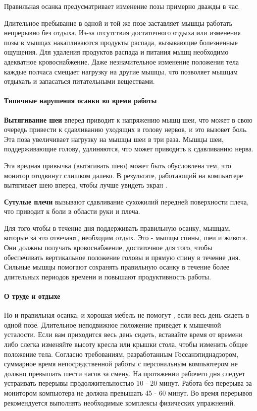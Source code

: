 \documentclass[russian,utf8,emptystyle]{eskdtext}
\begin{document}
\begin{spacing}{1.5}
Правильная осанка предусматривает изменение позы примерно дважды в час. 

Длительное пребывание в одной и той же позе заставляет мышцы работать непрерывно без отдыха. Из-за отсутствия достаточного отдыха или изменения позы в мышцах накапливаются продукты распада, вызывающие болезненные ощущения. Для удаления продуктов распада и питания мышц необходимо адекватное кровоснабжение. Даже незначительное изменение положения тела каждые полчаса смещает нагрузку на другие мышцы, что позволяет мышцам отдыхать и запасаться питательными веществами. 

\paragraph{Типичные нарушения осанки во время работы}
\textbf{Вытягивание шеи} вперед приводит к напряжению мышц шеи, что может в свою очередь привести к сдавливанию уходящих в голову нервов, и это вызовет боль. Эта поза увеличивает нагрузку на мышцы шеи в три раза. Мышцы шеи, поддерживающие голову, удлиняются, что может приводить к сдавливанию нерва.

Эта вредная привычка (вытягивать шею) может быть обусловлена тем, что монитор отодвинут слишком далеко. В результате, работающий на компьютере вытягивает шею вперед, чтобы лучше увидеть экран \cite{Shilova}.

\textbf{Сутулые плечи} вызывают сдавливание сухожилий передней поверхности плеча, что приводит к боли в области руки и плеча.

Для того чтобы в течение дня поддерживать правильную осанку, мышцам, которые за это отвечают, необходим отдых. Это - мышцы спины, шеи и живота. Они должны получать кровоснабжение, достаточное для того, чтобы обеспечивать вертикальное положение головы и прямую спину в течение дня. Сильные мышцы помогают сохранять правильную осанку в течение более длительных периодов времени и повышают продуктивность работы. 

\paragraph{О труде и отдыхе}
Но и правильная осанка, и хорошая мебель не помогут \cite{Shilova}, если весь день сидеть в одной позе. Длительное неподвижное положение приведет к мышечной усталости. Если вам приходится весь день сидеть, вставайте время от времени либо слегка изменяйте высоту кресла или крышки стола, чтобы изменить общее положение тела.
Согласно требованиям, разработанным Госсанэпиднадзором, суммарное время непосредственной работы с персональным компьютером не должно превышать шести часов за смену. На протяжении рабочего дня следует устраивать перерывы продолжительностью 10 - 20 минут. Работа без перерыва за монитором компьютера не должна превышать 45 - 60 минут. Во время перерывов рекомендуется выполнять необходимые комплексы физических упражнений.


\end{spacing}
\end{document}
